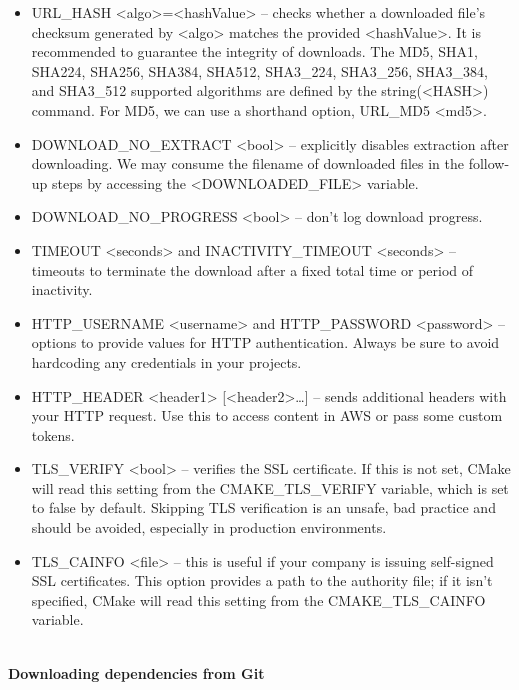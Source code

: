 \begin{itemize}
\item 
URL\_HASH <algo>=<hashValue> – checks whether a downloaded file's checksum generated by <algo> matches the provided <hashValue>. It is recommended to guarantee the integrity of downloads. The MD5, SHA1, SHA224, SHA256, SHA384, SHA512, SHA3\_224, SHA3\_256, SHA3\_384, and SHA3\_512 supported algorithms are defined by the string(<HASH>) command. For MD5, we can use a shorthand option, URL\_MD5 <md5>.

\item 
DOWNLOAD\_NO\_EXTRACT <bool> – explicitly disables extraction after downloading. We may consume the filename of downloaded files in the follow-up steps by accessing the <DOWNLOADED\_FILE> variable.

\item 
DOWNLOAD\_NO\_PROGRESS <bool> – don't log download progress.

\item 
TIMEOUT <seconds> and INACTIVITY\_TIMEOUT <seconds> – timeouts to terminate the download after a fixed total time or period of inactivity.

\item 
HTTP\_USERNAME <username> and HTTP\_PASSWORD <password> – options to provide values for HTTP authentication. Always be sure to avoid hardcoding any credentials in your projects.

\item 
HTTP\_HEADER <header1> [<header2>…] – sends additional headers with your HTTP request. Use this to access content in AWS or pass some custom tokens.

\item 
TLS\_VERIFY <bool> – verifies the SSL certificate. If this is not set, CMake will read this setting from the CMAKE\_TLS\_VERIFY variable, which is set to false by default. Skipping TLS verification is an unsafe, bad practice and should be avoided, especially in production environments.

\item 
TLS\_CAINFO <file> – this is useful if your company is issuing self-signed SSL certificates. This option provides a path to the authority file; if it isn't specified, CMake will read this setting from the CMAKE\_TLS\_CAINFO variable.
\end{itemize}

\hspace*{\fill} \\ %
\noindent
\textbf{Downloading dependencies from Git}

